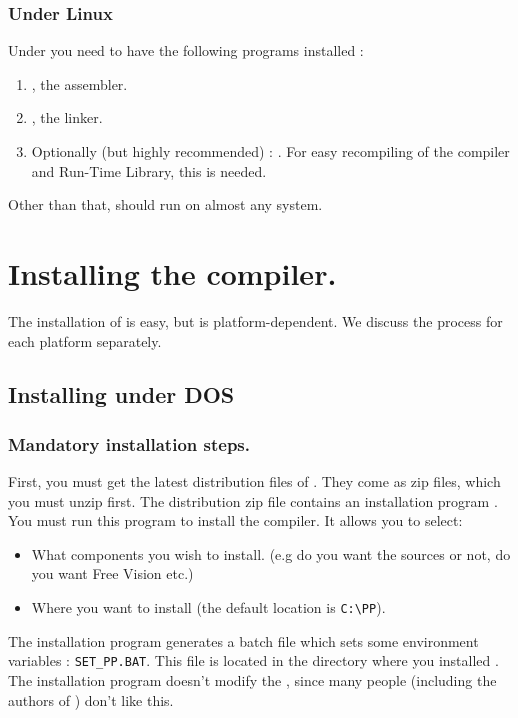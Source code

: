 \documentclass{report}
\begin{document}
\subsubsection{Under Linux}
Under \linux you need to have the following programs installed :
\begin{enumerate}
\item \gnu {}, the \gnu assembler.
\item \gnu {}, the \gnu linker.
\item Optionally (but highly recommended) : \gnu {}. For easy
recompiling of the compiler and Run-Time Library, this is needed.
\end{enumerate}
Other than that, \fpk should run on almost any \linux system.

\section{Installing the compiler.}
The installation of \fpk is easy, but is platform-dependent.
We discuss the process for each platform separately.


%
%

\subsection{Installing under DOS}
\subsubsection{Mandatory installation steps.}
First, you must get the latest distribution files of \fpk. They come as zip
files, which you must unzip first. The distribution zip file contains an
installation program . You must run this program to install
the compiler. It allows you to select:
\begin{itemize}
\item What components you wish to install. (e.g do you want the sources or
not, do you want Free Vision etc.)
\item Where you want to install (the default location is \verb|C:\PP|).
\end{itemize}
The installation program generates a batch file which sets some environment
variables : \verb|SET_PP.BAT|. This file is located in the directory where
you installed \fpk. The installation program doesn't modify the 
, since many people (including the authors of \fpk) 
don't like this.
\end{document}
